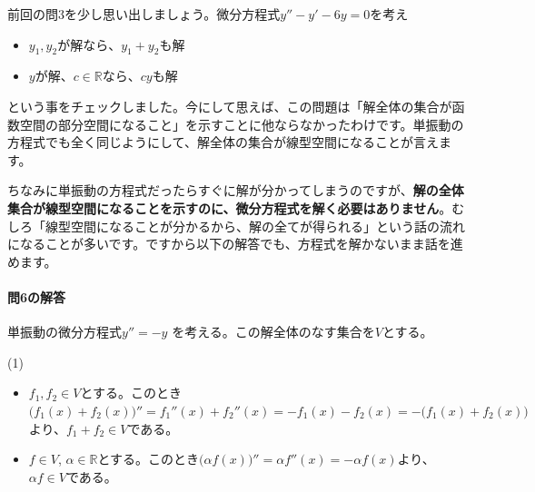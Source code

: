 前回の問$3$を少し思い出しましょう。微分方程式$y'' - y' - 6y = 0$を考え
\begin{itemize}
\item $y_1, y_2$が解なら、$y_1 + y_2$も解
\item $y$が解、$c\in\mathbb{R}$なら、$cy$も解
\end{itemize}
という事をチェックしました。今にして思えば、この問題は「解全体の集合が函数空間の部分空間になること」を示すことに他ならなかったわけです。単振動の方程式でも全く同じようにして、解全体の集合が線型空間になることが言えます。

ちなみに単振動の方程式だったらすぐに解が分かってしまうのですが、\textbf{解の全体集合が線型空間になることを示すのに、微分方程式を解く必要はありません}。むしろ「線型空間になることが分かるから、解の全てが得られる」という話の流れになることが多いです。ですから以下の解答でも、方程式を解かないまま話を進めます。

\paragraph{問6の解答} 単振動の微分方程式$y'' = -y$ を考える。この解全体のなす集合を$V$とする。

\noindent (1) 
\begin{itemize}
\item $f_1, f_2 \in V$とする。このとき$\bigl(f_1(x) + f_2(x)\bigr)'' = f_1''(x) + f_2''(x) = -f_1(x) - f_2(x) = -\bigl(f_1(x) + f_2(x)\bigr)$より、$f_1 + f_2 \in V$である。
\item $f \in V$, $\alpha\in\mathbb{R}$とする。このとき$\bigl(\alpha f(x)\bigr)'' = \alpha f''(x) = -\alpha f(x)$より、$\alpha f \in V$である。
\end{itemize}

